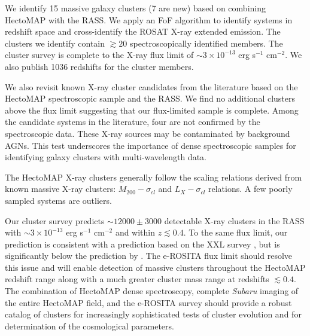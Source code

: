 \documentclass[iop, apj]{emulateapj}
\begin{document}
We identify 15 massive galaxy clusters (7 are new) 
 based on combining HectoMAP with the RASS. 
We apply an FoF algorithm to identify systems in redshift space 
 and cross-identify the ROSAT X-ray extended emission. 
The clusters we identify contain $\gtrsim 20$ spectroscopically identified members.
The cluster survey is complete to the X-ray flux limit of  
 $\sim 3 \times 10^{-13}$ erg s$^{-1}$ cm$^{-2}$. 
We also publish 1036 redshifts for the cluster members.

We also revisit known X-ray cluster candidates from the literature 
 based on the HectoMAP spectroscopic sample and the RASS. 
We find no additional clusters above the flux limit suggesting that 
 our flux-limited sample is complete. 
Among the candidate systems in the literature, 
 four are not confirmed by the spectroscopic data. 
These X-ray sources may be contaminated by background AGNs.
This test underscores 
 the importance of dense spectroscopic samples 
 for identifying galaxy clusters with multi-wavelength data.
 
The HectoMAP X-ray clusters 
 generally follow the scaling relations derived from known massive X-ray clusters: 
 $M_{200} - \sigma_{cl}$ and $L_{X} - \sigma_{cl}$ relations. 
A few poorly sampled systems are outliers. 
 
Our cluster survey predicts
 $\sim12000 \pm 3000$ detectable X-ray clusters in the RASS 
 with $\sim 3 \times 10^{-13}$ erg s$^{-1}$ cm$^{-2}$ and within $z \lesssim 0.4$. 
To the same flux limit, 
 our prediction is consistent with a prediction based on the XXL survey \citep{Pacaud16},
 but is significantly below the prediction by \citet{Schuecker04}.  
The e-ROSITA flux limit should resolve this issue and will enable detection of 
 massive clusters throughout the HectoMAP redshift range 
 along with a much greater cluster mass range at redshifts $\lesssim 0.4$. 
The combination of HectoMAP dense spectroscopy, 
 complete {\it Subaru} imaging of the entire HectoMAP field, and the e-ROSITA survey
 should provide a robust catalog of clusters for
 increasingly sophisticated tests of cluster evolution and
 for determination of the cosmological parameters.
 
 
\end{document}

